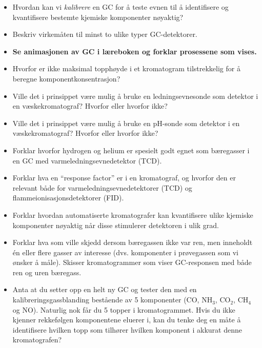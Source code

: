 \begin{itemize}
\item{} Hvordan kan vi {\it kalibrere} en GC for å teste evnen til å identifisere og kvantifisere bestemte kjemiske komponenter nøyaktig?
\item{} Beskriv virkemåten til minst to ulike typer GC-detektorer.
\item{} {\bf Se animasjonen av GC i læreboken og forklar prosessene som vises.}
\item{} Hvorfor er ikke maksimal topphøyde i et kromatogram tilstrekkelig for å beregne komponentkonsentrasjon?
\item{} Ville det i prinsippet være mulig å bruke en ledningsevnesonde som detektor i en væskekromatograf?  Hvorfor eller hvorfor ikke?
\item{} Ville det i prinsippet være mulig å bruke en pH-sonde som detektor i en væskekromatograf?  Hvorfor eller hvorfor ikke?
\item{} Forklar hvorfor hydrogen og helium er spesielt godt egnet som bæregasser i en GC med varmeledningsevnedetektor (TCD).
\item{} Forklar hva en ``response factor'' er i en kromatograf, og hvorfor den er relevant både for varmeledningsevnedetektorer (TCD) og flammeionisasjonsdetektorer (FID).
\item{} Forklar hvordan automatiserte kromatografer kan kvantifisere ulike kjemiske komponenter nøyaktig når disse stimulerer detektoren i ulik grad.
\item{} Forklar hva som ville skjedd dersom bæregassen ikke var ren, men inneholdt én eller flere gasser av interesse (dvs. komponenter i prøvegassen som vi ønsker å måle).  Skisser kromatogrammer som viser GC-responsen med både ren og uren bæregass.
\item{} Anta at du setter opp en helt ny GC og tester den med en kalibreringsgassblanding bestående av 5 komponenter (CO, NH$_{3}$, CO$_{2}$, CH$_{4}$ og NO).  Naturlig nok får du 5 topper i kromatogrammet.  Hvis du ikke kjenner rekkefølgen komponentene eluerer i, kan du tenke deg en måte å identifisere hvilken topp som tilhører hvilken komponent i akkurat denne kromatografen?
\end{itemize}


